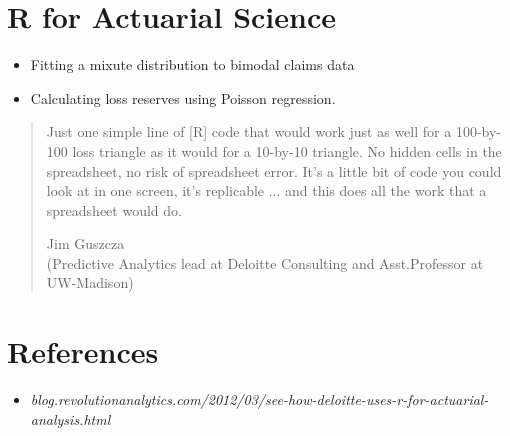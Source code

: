 \documentclass[12pt]{article}
\begin{document}
\newpage
\section{R for Actuarial Science}
\begin{itemize}
\item Fitting a mixute distribution to bimodal claims data
\item Calculating loss reserves using Poisson regression.
\end{itemize}
\begin{quotation}
Just one simple line of [R] code that would work just as well for a 100-by-100 loss triangle as it would for a 10-by-10 triangle. No hidden cells in the spreadsheet, no risk of spreadsheet error. It's a little bit of code you could look at in one screen, it's replicable ... and this does all the work that a spreadsheet would do.

Jim Guszcza \\(Predictive Analytics lead at Deloitte Consulting and Asst.Professor at UW-Madison)
\end{quotation}

\section{References}
\begin{itemize}
\item \textit{\small{blog.revolutionanalytics.com/2012/03/see-how-deloitte-uses-r-for-actuarial-analysis.html}}
\end{itemize}
\end{document}
